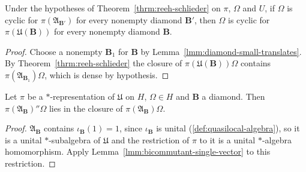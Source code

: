 \begin{corollary}
    \label{crllr:reeh-schlieder-cyclic}
    \leanok
    Under the hypotheses of Theorem~\ref{thrm:reeh-schlieder} on $\pi$, $\Omega$ and $U$, if $\Omega$ is cyclic for $\pi(\mathfrak{A}_{\mathbf{B}'})$ for every nonempty diamond $\mathbf{B}'$, then $\Omega$ is cyclic for $\pi(\mathfrak{U}(\mathbf{B}))$ for every nonempty diamond $\mathbf{B}$.
\end{corollary}
\begin{proof}
    \leanok
    Choose a nonempty $\mathbf{B}_1$ for $\mathbf{B}$ by Lemma~\ref{lmm:diamond-small-translates}. By Theorem~\ref{thrm:reeh-schlieder} the closure of $\pi(\mathfrak{U}(\mathbf{B}))\Omega$ contains $\pi(\mathfrak{A}_{\mathbf{B}_1})\Omega$, which is dense by hypothesis.
\end{proof}

\begin{lemma}
    \label{lmm:bicommutant-orbit-closure}
    \leanok
    Let $\pi$ be a $*$-representation of $\mathfrak{U}$ on $H$, $\Omega \in H$ and $\mathbf{B}$ a diamond. Then $\pi(\mathfrak{A}_{\mathbf{B}})''\Omega$ lies in the closure of $\pi(\mathfrak{A}_{\mathbf{B}})\Omega$.
\end{lemma}
\begin{proof}
    \leanok
    $\mathfrak{A}_{\mathbf{B}}$ contains $\iota_{\mathbf{B}}(1) = 1$, since $\iota_{\mathbf{B}}$ is unital (\ref{def:quasilocal-algebra}), so it is a unital $*$-subalgebra of $\mathfrak{U}$ and the restriction of $\pi$ to it is a unital $*$-algebra homomorphism. Apply Lemma~\ref{lmm:bicommutant-single-vector} to this restriction.
\end{proof}

